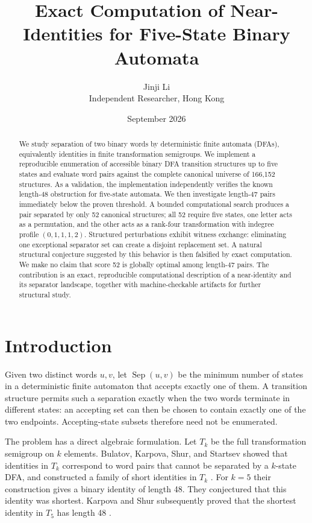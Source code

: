 \documentclass[10pt]{article}
\title{\textbf{Exact Computation of Near-Identities for Five-State Binary Automata}}
\author{Jinji Li\\\small Independent Researcher, Hong Kong}
\date{September 2026}
\newcommand{\Sep}{\operatorname{Sep}}
\begin{document}
\maketitle
\vspace{-1.4em}

\begin{abstract}
We study separation of two binary words by deterministic finite automata (DFAs), equivalently identities in finite transformation semigroups.  We implement a reproducible enumeration of accessible binary DFA transition structures up to five states and evaluate word pairs against the complete canonical universe of 166,152 structures.  As a validation, the implementation independently verifies the known length-48 obstruction for five-state automata.  We then investigate length-47 pairs immediately below the proven threshold.  A bounded computational search produces a pair separated by only 52 canonical structures; all 52 require five states, one letter acts as a permutation, and the other acts as a rank-four transformation with indegree profile $(0,1,1,1,2)$.  Structured perturbations exhibit witness exchange: eliminating one exceptional separator set can create a disjoint replacement set.  A natural structural conjecture suggested by this behavior is then falsified by exact computation.  We make no claim that score 52 is globally optimal among length-47 pairs.  The contribution is an exact, reproducible computational description of a near-identity and its separator landscape, together with machine-checkable artifacts for further structural study.
\end{abstract}

\section{Introduction}
Given two distinct words $u,v$, let $\Sep(u,v)$ be the minimum number of states in a deterministic finite automaton that accepts exactly one of them.  A transition structure permits such a separation exactly when the two words terminate in different states: an accepting set can then be chosen to contain exactly one of the two endpoints.  Accepting-state subsets therefore need not be enumerated.

The problem has a direct algebraic formulation.  Let $T_k$ be the full transformation semigroup on $k$ elements.  Bulatov, Karpova, Shur, and Startsev showed that identities in $T_k$ correspond to word pairs that cannot be separated by a $k$-state DFA, and constructed a family of short identities in $T_k$ \cite{BKSS2017}.  For $k=5$ their construction gives a binary identity of length 48.  They conjectured that this identity was shortest.  Karpova and Shur subsequently proved that the shortest identity in $T_5$ has length 48 \cite{KS2021}.
\end{document}
